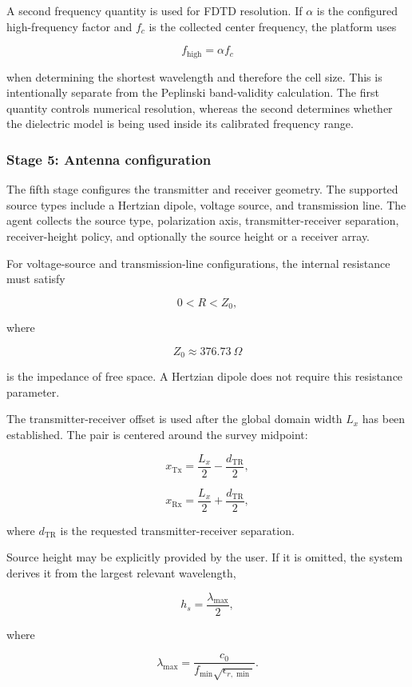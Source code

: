 \documentclass[journal]{IEEEtran}
\begin{document}
A second frequency quantity is used for FDTD resolution. If \(\alpha\) is the configured high-frequency factor and \(f_c\) is the collected center frequency, the platform uses

$$
f_{\mathrm{high}}=\alpha f_c
$$

when determining the shortest wavelength and therefore the cell size. This is intentionally separate from the Peplinski band-validity calculation. The first quantity controls numerical resolution, whereas the second determines whether the dielectric model is being used inside its calibrated frequency range.

\subsubsection{Stage 5: Antenna configuration}

The fifth stage configures the transmitter and receiver geometry. The supported source types include a Hertzian dipole, voltage source, and transmission line. The agent collects the source type, polarization axis, transmitter-receiver separation, receiver-height policy, and optionally the source height or a receiver array.

For voltage-source and transmission-line configurations, the internal resistance must satisfy

$$
0 < R < Z_0,
$$

where

$$
Z_0 \approx 376.73\ \Omega
$$

is the impedance of free space. A Hertzian dipole does not require this resistance parameter.

The transmitter-receiver offset is used after the global domain width \(L_x\) has been established. The pair is centered around the survey midpoint:

$$
x_{\mathrm{Tx}}
=
\frac{L_x}{2}
-
\frac{d_{\mathrm{TR}}}{2},
$$

$$
x_{\mathrm{Rx}}
=
\frac{L_x}{2}
+
\frac{d_{\mathrm{TR}}}{2},
$$

where \(d_{\mathrm{TR}}\) is the requested transmitter-receiver separation.

Source height may be explicitly provided by the user. If it is omitted, the system derives it from the largest relevant wavelength,

$$
h_s = \frac{\lambda_{\max}}{2},
$$

where

$$
\lambda_{\max}
=
\frac{c_0}
{f_{\min}\sqrt{\epsilon_{r,\min}}}.
$$
\end{document}
